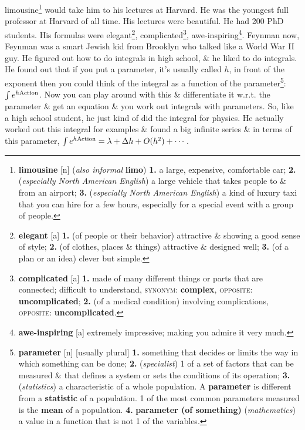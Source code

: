 \documentclass[oneside]{book}
\numberwithin{equation}{section}
\begin{document}
limousine\footnote{\textbf{limousine} [n] (\textit{also informal} \textbf{limo}) \textbf{1.} a large, expensive, comfortable car; \textbf{2.} (\textit{especially North American English}) a large vehicle that takes people to \& from an airport; \textbf{3.} (\textit{especially North American English}) a kind of luxury taxi that you can hire for a few hours, especially for a special event with a group of people.} would take him to his lectures at Harvard. He was the youngest full professor at Harvard of all time. His lectures were beautiful. He had 200 PhD students. His formulas were elegant\footnote{\textbf{elegant} [a] \textbf{1.} (of people or their behavior) attractive \& showing a good sense of style; \textbf{2.} (of clothes, places \& things) attractive \& designed well; \textbf{3.} (of a plan or an idea) clever but simple.}, complicated\footnote{\textbf{complicated} [a] \textbf{1.} made of many different things or parts that are connected; difficult to understand, \textsc{synonym}: \textbf{complex}, \textsc{opposite}: \textbf{uncomplicated}; \textbf{2.} (of a medical condition) involving complications, \textsc{opposite}: \textbf{uncomplicated}.}, awe-inspiring\footnote{\textbf{awe-inspiring} [a] extremely impressive; making you admire it very much.}. Feynman now, Feynman was a smart Jewish kid from Brooklyn who talked like a World War II guy. He figured out how to do integrals in high school, \& he liked to do integrals. He found out that if you put a parameter, it's usually called $h$, in front of the exponent then you could think of the integral as a function of the parameter\footnote{\textbf{parameter} [n] [usually plural] \textbf{1.} something that decides or limits the way in which something can be done; \textbf{2.} (\textit{specialist}) 1 of a set of factors that can be measured \& that defines a system or sets the conditions of its operation; \textbf{3.} (\textit{statistics}) a characteristic of a whole population. A \textbf{parameter} is different from a \textbf{statistic} of a population. 1 of the most common parameters measured is the \textbf{mean} of a population. \textbf{4.} \textbf{parameter (of something)} (\textit{mathematics}) a value in a function that is not 1 of the variables.}: $\int e^{h{\rm Action}}$. Now you can play around with this \& differentiate it w.r.t. the parameter \& get an equation \& you work out integrals with parameters. So, like a high school student, he just kind of did the integral for physics. He actually worked out this integral for examples \& found a big infinite series \& in terms of this parameter, $\int e^{h{\rm Action}} = \lambda + \Delta h + O(h^2) + \cdots$.
\end{document}
